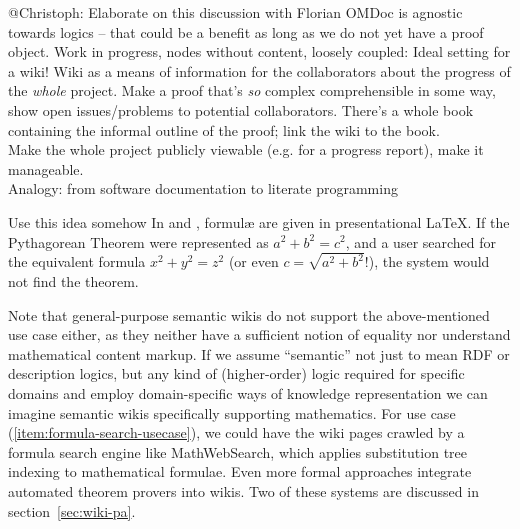 
\begin{todo}{@Christoph: Elaborate on this discussion with Florian}
  OMDoc is agnostic towards logics -- that could be a benefit as long as we do not yet
  have a proof object. Work in progress, nodes without content, loosely coupled: Ideal
  setting for a wiki!  Wiki as a means of information for the collaborators about the
  progress of the \emph{whole} project.  Make a proof that's \emph{so} complex
  comprehensible in some way, show open issues/problems to potential collaborators.
  There's a whole book containing the informal outline of the proof; link the wiki to the
  book.\\
  Make the whole project publicly viewable (e.g. for a progress report), make it
  manageable.\\
  Analogy: from software documentation to literate programming
\end{todo}


\begin{oldpart}{Use this idea somehow}
  In  and , formulæ are given in presentational
  {\LaTeX}.  If the Pythagorean Theorem were represented as $a^2 + b^2 = c^2$, and a user
  searched for the equivalent formula $x^2 + y^2 = z^2$ (or even $c=\sqrt{a^2+b^2}$!), the
  system would not find the theorem.

  Note that general-purpose semantic wikis do not support the above-mentioned use case
  either, as they neither have a sufficient notion of equality nor understand mathematical
  content markup.  If we assume ``semantic'' not just to mean RDF or description logics,
  but any kind of (higher-order) logic required for specific domains and employ
  domain-specific ways of knowledge representation we can imagine semantic wikis
  specifically supporting mathematics.  For use case (\ref{item:formula-search-usecase}),
  we could have the wiki pages crawled by a formula search engine like
  MathWebSearch\cite{KohSuc:asemf06}, which applies substitution tree indexing to
  mathematical formulae.  Even more formal approaches integrate automated theorem provers
  into wikis.  Two of these systems are discussed in section~\ref{sec:wiki-pa}.
\end{oldpart}




